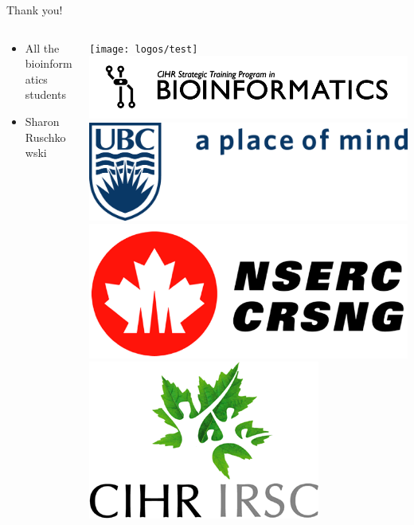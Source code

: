 \documentclass{beamer}
\begin{document}
\begin{frame}{Thank you!}
    \begin{columns}
        \begin{column}{0.5\textwidth}
            \begin{itemize}
                \item All the bioinformatics students
                \item Sharon Ruschkowski
            \end{itemize}
        \end{column}
        \begin{column}{0.5\textwidth}
            \begin{center}
                \texttt{[image: logos/test]} \\
                \includegraphics[scale=0.2]{logos/bioinfo} \\
                \includegraphics[scale=0.2]{logos/ubc} \\
                \includegraphics[scale=0.1]{logos/nserc} \\
                \includegraphics[scale=0.2]{logos/cihr}
            \end{center}
        \end{column}
    \end{columns}
\end{frame}
\end{document}
